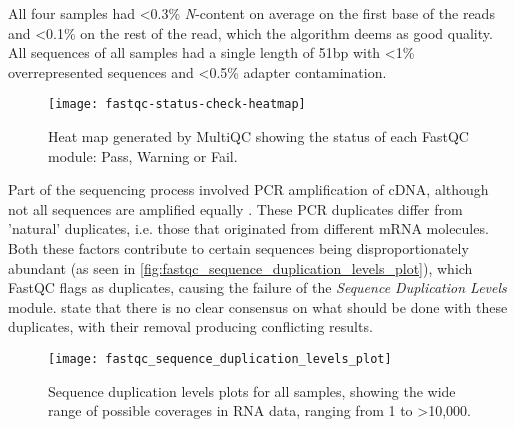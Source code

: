 All four samples had <0.3\% \textit{N}-content on average on the first base of the reads and <0.1\% on the rest of the read, which the algorithm deems as good quality. All sequences of all samples had a single length of 51bp with <1\% overrepresented sequences and <0.5\% adapter contamination.






\newpage
\begin{figure}[!h]
    \centering
    \texttt{[image: fastqc-status-check-heatmap]}
    \caption[Heat map showing the status of each FastQC module]{Heat map generated by MultiQC showing the status of each FastQC module: Pass, Warning or Fail.} 
    \label{fig:fastqc-status-check-heatmap}
\end{figure}

\newpage
Part of the sequencing process involved PCR amplification of cDNA, although not all sequences are amplified equally \citep{kozarewa2009amplification}. These PCR duplicates differ from 'natural' duplicates, i.e. those that originated from different mRNA molecules. Both these factors contribute to certain sequences being disproportionately abundant (as seen in \autoref{fig:fastqc_sequence_duplication_levels_plot}), which FastQC flags as duplicates, causing the failure of the \textit{Sequence Duplication Levels} module. \cite{parekh2016impact} state that there is no clear consensus on what should be done with these duplicates, with their removal producing conflicting results.

\begin{figure}[!h]
    \centering
    \texttt{[image: fastqc\_sequence\_duplication\_levels\_plot]}
    \caption[Sequence duplication levels plots for all samples]{Sequence duplication levels plots for all samples, showing the wide range of possible coverages in RNA data, ranging from 1 to >10,000.} 
    \label{fig:fastqc_sequence_duplication_levels_plot}
\end{figure}

